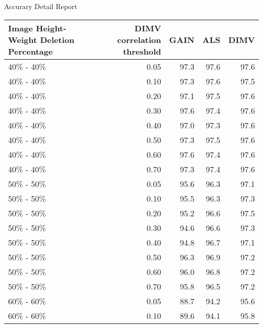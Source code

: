  Accurary Detail Report 
 \begin{tabular}{lrrrr}
\toprule
Image Height-Weight Deletion Percentage &  DIMV correlation threshold &  GAIN &  ALS &  DIMV \\
\midrule
                              40\% - 40\% &                        0.05 &  97.3 & 97.6 &  97.6 \\
                              40\% - 40\% &                        0.10 &  97.3 & 97.6 &  97.5 \\
                              40\% - 40\% &                        0.20 &  97.1 & 97.5 &  97.6 \\
                              40\% - 40\% &                        0.30 &  97.6 & 97.4 &  97.6 \\
                              40\% - 40\% &                        0.40 &  97.0 & 97.3 &  97.6 \\
                              40\% - 40\% &                        0.50 &  97.3 & 97.5 &  97.6 \\
                              40\% - 40\% &                        0.60 &  97.6 & 97.4 &  97.6 \\
                              40\% - 40\% &                        0.70 &  97.3 & 97.4 &  97.6 \\
                              50\% - 50\% &                        0.05 &  95.6 & 96.3 &  97.1 \\
                              50\% - 50\% &                        0.10 &  95.5 & 96.3 &  97.3 \\
                              50\% - 50\% &                        0.20 &  95.2 & 96.6 &  97.5 \\
                              50\% - 50\% &                        0.30 &  94.6 & 96.6 &  97.3 \\
                              50\% - 50\% &                        0.40 &  94.8 & 96.7 &  97.1 \\
                              50\% - 50\% &                        0.50 &  96.3 & 96.9 &  97.2 \\
                              50\% - 50\% &                        0.60 &  96.0 & 96.8 &  97.2 \\
                              50\% - 50\% &                        0.70 &  95.8 & 96.5 &  97.2 \\
                              60\% - 60\% &                        0.05 &  88.7 & 94.2 &  95.6 \\
                              60\% - 60\% &                        0.10 &  89.6 & 94.1 &  95.8 \\

\end{tabular}
